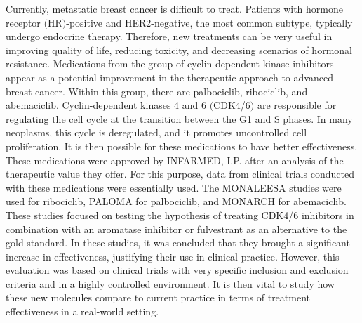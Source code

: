 Currently, metastatic breast cancer is difficult to treat. Patients with hormone receptor $($HR$)$-positive and HER2-negative, the most common subtype, typically undergo endocrine therapy. Therefore, new treatments can be very useful in improving quality of life, reducing toxicity, and decreasing scenarios of hormonal resistance.
Medications from the group of cyclin-dependent kinase inhibitors appear as a potential improvement in the therapeutic approach to advanced breast cancer. Within this group, there are palbociclib, ribociclib, and abemaciclib. Cyclin-dependent kinases 4 and 6 $($CDK4/6$)$ are responsible for regulating the cell cycle at the transition between the G1 and S phases. In many neoplasms, this cycle is deregulated, and it promotes uncontrolled cell proliferation. It is then possible for these medications to have better effectiveness. These medications were approved by INFARMED, I.P. after an analysis of the therapeutic value they offer. For this purpose, data from clinical trials conducted with these medications were essentially used. The MONALEESA \cite{hortobagyiUpdatedResultsMONALEESA22018, slamonPhaseIIIRandomized2018, tripathyRibociclibEndocrineTherapy2018} studies were used for ribociclib, PALOMA \cite{vermaPalbociclibCombinationFulvestrant2016, rugoImpactPalbociclibLetrozole2018, finnCyclindependentKinaseInhibitor2015a} for palbociclib, and MONARCH \cite{goetzMONARCHAbemaciclibInitial2017, sledgeMONARCHAbemaciclibCombination2017} for abemaciclib.
These studies focused on testing the hypothesis of treating CDK4/6 inhibitors in combination with an aromatase inhibitor or fulvestrant as an alternative to the gold standard. In these studies, it was concluded that they brought a significant increase in effectiveness, justifying their use in clinical practice.
However, this evaluation was based on clinical trials with very specific inclusion and exclusion criteria and in a highly controlled environment. It is then vital to study how these new molecules compare to current practice in terms of treatment effectiveness in a real-world setting.